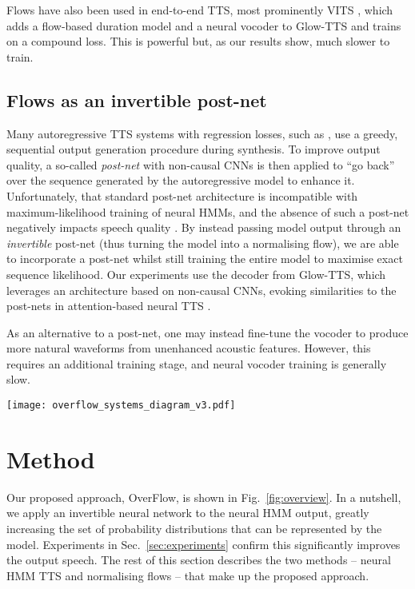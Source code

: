 \documentclass[british]{INTERSPEECH2023_arxiv}
\begin{document}
Flows have also been used in end-to-end TTS, most prominently VITS \cite{kim2021vits}, which adds a flow-based duration model and a neural vocoder to Glow-TTS and trains on a compound loss.
This is powerful but, as our results show, much slower to train.

\subsection{Flows as an invertible post-net}
Many autoregressive TTS systems with regression losses, such as \cite{wang2017tacotron,shen2018natural,li2019neural},
use a greedy, sequential output generation procedure during synthesis.
To improve output quality, a so-called \emph{post-net} with non-causal
CNNs is then applied to ``go back'' over the sequence generated by the autoregressive model to enhance it.
Unfortunately, that standard post-net architecture is incompatible with
maximum-likelihood training of neural HMMs, and the absence of such a post-net negatively impacts speech quality \cite{mehta2022neural}.
By instead passing model output through an \emph{invertible} post-net (thus turning the model into a normalising flow), we are able to incorporate a post-net whilst still training the entire model to maximise exact sequence likelihood.
Our experiments use the decoder from Glow-TTS, which
leverages an architecture based on non-causal CNNs, evoking similarities to the post-nets in attention-based neural TTS \cite{wang2017tacotron,shen2018natural,li2019neural}.


As an alternative to a post-net, one may instead fine-tune the vocoder to produce more natural waveforms from unenhanced acoustic features.
However, this requires an additional training stage, and neural vocoder training is generally slow.

\begin{figure*}
\centering
\texttt{[image: overflow\_systems\_diagram\_v3.pdf]}
\caption{Comparison of four systems from the experiments. Square brackets show how the OverFlow system passes the output of a neural HMM though the invertible neural network from Glow-TTS, similar to the post-net in Tacotron 2. Rectangular boxes are vectors and scalars, rounded boxes are learnt transformations (neural networks), and ovals are fixed mathematical operations.}
\label{fig:overview}
\vspace{-1.5\baselineskip}
\end{figure*}
\section{Method}
\label{sec:method}
Our proposed approach, OverFlow, 
is shown in Fig.\ \ref{fig:overview}.
In a nutshell, we apply an invertible neural network to the neural HMM output, greatly increasing the set of probability distributions that can be represented by the model.
Experiments in Sec.\ \ref{sec:experiments} confirm this significantly improves the output speech.
The rest of this section describes the two methods -- neural HMM TTS and normalising flows -- that make up the proposed approach.
\end{document}
